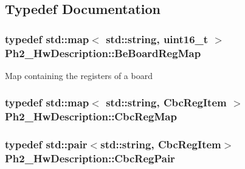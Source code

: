 \subsection{Typedef Documentation}
\hypertarget{namespace_ph2___hw_description_a2e13fb82c8ed98154c60f9d0f8467d72}{
\subsubsection[{Be\-Board\-Reg\-Map}]{\setlength{\rightskip}{0pt plus 5cm}typedef std\-::map$<$ std\-::string, uint16\-\_\-t $>$ {\bf Ph2\-\_\-\-Hw\-Description\-::\-Be\-Board\-Reg\-Map}}}\label{namespace_ph2___hw_description_a2e13fb82c8ed98154c60f9d0f8467d72}
Map containing the registers of a board \hypertarget{namespace_ph2___hw_description_a9a23b373068f169aa67ca1d22c9a6001}{
\subsubsection[{Cbc\-Reg\-Map}]{\setlength{\rightskip}{0pt plus 5cm}typedef std\-::map$<$ std\-::string, {\bf Cbc\-Reg\-Item} $>$ {\bf Ph2\-\_\-\-Hw\-Description\-::\-Cbc\-Reg\-Map}}}\label{namespace_ph2___hw_description_a9a23b373068f169aa67ca1d22c9a6001}
\hypertarget{namespace_ph2___hw_description_a78856413327152e693dceca249188d11}{
\subsubsection[{Cbc\-Reg\-Pair}]{\setlength{\rightskip}{0pt plus 5cm}typedef std\-::pair$<$std\-::string, {\bf Cbc\-Reg\-Item}$>$ {\bf Ph2\-\_\-\-Hw\-Description\-::\-Cbc\-Reg\-Pair}}}\label{namespace_ph2___hw_description_a78856413327152e693dceca249188d11}
